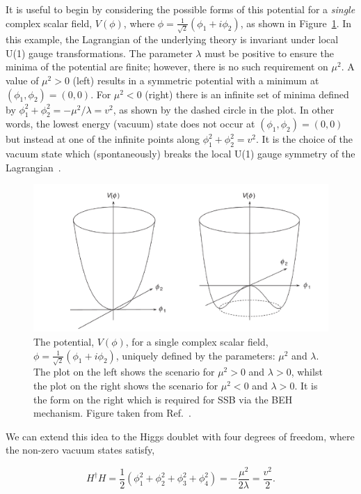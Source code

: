\noindent
It is useful to begin by considering the possible forms of this potential for a \textit{single} complex scalar field, $V(\phi)$, where $\phi=\frac{1}{\sqrt{2}}(\phi_1+i\phi_2)$, as shown in Figure~\ref{fig:higgs_potential}. In this example, the Lagrangian of the underlying theory is invariant under local U(1) gauge transformations. The parameter $\lambda$ must be positive to ensure the minima of the potential are finite; however, there is no such requirement on $\mu^2$. A value of $\mu^2>0$ (left) results in a symmetric potential with a minimum at $(\phi_1,\phi_2)=(0,0)$. For $\mu^2<0$ (right) there is an infinite set of minima defined by $\phi_1^2+\phi_2^2=-\mu^2/\lambda=v^2$, as shown by the dashed circle in the plot. In other words, the lowest energy (vacuum) state does not occur at $(\phi_1,\phi_2)=(0,0)$ but instead at one of the infinite points along $\phi_1^2+\phi_2^2=v^2$. It is the choice of the vacuum state which (spontaneously) breaks the local U(1) gauge symmetry of the Lagrangian~\cite{Thomson:2013zua}.

\begin{figure}
  \centering
  \includegraphics[width=.65\linewidth]{Figures/theory/higgs_potential.pdf}
  \caption[The Higgs potential]
  {
    The potential, $V(\phi)$, for a single complex scalar field, $\phi=\frac{1}{\sqrt{2}}(\phi_1+i\phi_2)$, uniquely defined by the parameters: $\mu^2$ and $\lambda$. The plot on the left shows the scenario for $\mu^2>0$ and $\lambda>0$, whilst the plot on the right shows the scenario for $\mu^2<0$ and $\lambda>0$. It is the form on the right which is required for SSB via the BEH mechanism. Figure taken from Ref.~\cite{Thomson:2013zua}.
  }
  \label{fig:higgs_potential}
\end{figure}

We can extend this idea to the Higgs doublet with four degrees of freedom, where the non-zero vacuum states satisfy,

\begin{equation}
    H^{\dagger}H = \frac{1}{2}(\phi_1^2+\phi_2^2+\phi_3^2+\phi_4^2) = -\frac{\mu^2}{2\lambda} = \frac{v^2}{2}.
\end{equation}

